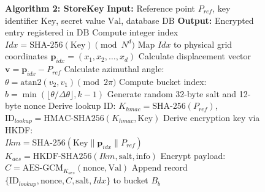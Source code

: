 \documentclass[conference,a4paper]{IEEEtran}
\begin{document}
\begin{figure}[!ht]
\centering
\begin{minipage}{\linewidth}
\begin{algorithmic}[1]
\STATE \textbf{Algorithm 2: StoreKey}
\STATE \textbf{Input:} Reference point $P_{ref}$, key identifier $\text{Key}$, secret value $\text{Val}$, database $\text{DB}$
\STATE \textbf{Output:} Encrypted entry registered in $\text{DB}$
\STATE Compute integer index $Idx = \text{SHA-256}(\text{Key}) \pmod{N^d}$
\STATE Map $Idx$ to physical grid coordinates $\mathbf{p}_{idx} = (x_1, x_2, \dots, x_d)$
\STATE Calculate displacement vector $\mathbf{v} = \mathbf{p}_{idx} - P_{ref}$
\STATE Calculate azimuthal angle: $\theta = \text{atan2}(v_2, v_1) \pmod{2\pi}$
\STATE Compute bucket index: $b = \min(\lfloor \theta / \Delta\theta \rfloor, k - 1)$
\STATE Generate random 32-byte salt and 12-byte nonce
\STATE Derive lookup ID: $K_{hmac} = \text{SHA-256}(P_{ref})$, $\text{ID}_{lookup} = \text{HMAC-SHA256}(K_{hmac}, \text{Key})$
\STATE Derive encryption key via HKDF: \\
       $Ikm = \text{SHA-256}(\text{Key} \parallel \mathbf{p}_{idx} \parallel P_{ref})$ \\
       $K_{aes} = \text{HKDF-SHA256}(Ikm, \text{salt}, \text{info})$
\STATE Encrypt payload: $C = \text{AES-GCM}_{K_{aes}}(\text{nonce}, \text{Val})$
\STATE Append record $\{\text{ID}_{lookup}, \text{nonce}, C, \text{salt}, Idx\}$ to bucket $B_b$
\end{algorithmic}
\end{minipage}
\end{figure}
\end{document}
